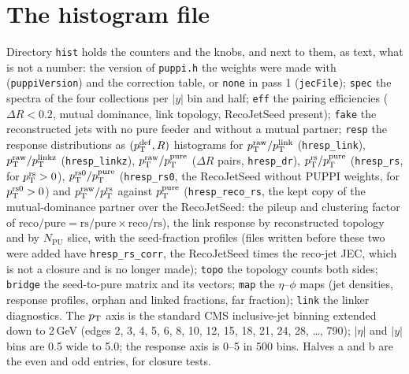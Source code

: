 \section{The histogram file}
\label{s:histos}
Directory \texttt{hist} holds the counters and the knobs, and next to them,
as text, what is not a number: the version of \texttt{puppi.h} the weights
were made with (\texttt{puppiVersion}) and the correction table, or
\texttt{none} in pass 1 (\texttt{jecFile}); \texttt{spec} the spectra
of the four collections per $|y|$ bin and half; \texttt{eff} the pairing
efficiencies ($\Delta R<0.2$, mutual dominance, link topology, RecoJetSeed
present); \texttt{fake} the reconstructed jets with no pure feeder and without
a mutual partner; \texttt{resp} the response distributions as
$(p_{\mathrm{T}}^{\mathrm{def}}, R)$ histograms for $p_{\mathrm{T}}^{\mathrm{raw}}/p_{\mathrm{T}}^{\mathrm{link}}$
(\texttt{hresp\_link}), $p_{\mathrm{T}}^{\mathrm{raw}}/p_{\mathrm{T}}^{\mathrm{linkz}}$ (\texttt{hresp\_linkz}),
$p_{\mathrm{T}}^{\mathrm{raw}}/p_{\mathrm{T}}^{\mathrm{pure}}$ ($\Delta R$ pairs, \texttt{hresp\_dr}), $p_{\mathrm{T}}^{\mathrm{rs}}/p_{\mathrm{T}}^{\mathrm{pure}}$
(\texttt{hresp\_rs}, for $p_{\mathrm{T}}^{\mathrm{rs}}>0$), $p_{\mathrm{T}}^{\mathrm{rs0}}/p_{\mathrm{T}}^{\mathrm{pure}}$
(\texttt{hresp\_rs0}, the RecoJetSeed without PUPPI weights, for
$p_{\mathrm{T}}^{\mathrm{rs0}}>0$) and $p_{\mathrm{T}}^{\mathrm{raw}}/p_{\mathrm{T}}^{\mathrm{rs}}$ against $p_{\mathrm{T}}^{\mathrm{pure}}$
(\texttt{hresp\_reco\_rs}, the kept copy of the mutual-dominance partner over
the RecoJetSeed: the pileup and clustering factor of
$\mathrm{reco}/\mathrm{pure} = \mathrm{rs}/\mathrm{pure}\times\mathrm{reco}/\mathrm{rs}$),
the link response by reconstructed topology and by $N_{\mathrm{PU}}$ slice,
with the seed-fraction profiles (files written before these two were added have
\texttt{hresp\_rs\_corr}, the RecoJetSeed times the reco-jet JEC, which is
not a closure and is no longer made); \texttt{topo} the topology counts both sides;
\texttt{bridge} the seed-to-pure matrix and its vectors; \texttt{map} the
$\eta$--$\phi$ maps (jet densities, response profiles, orphan and linked
fractions, far fraction); \texttt{link} the linker diagnostics. The
$p_{\mathrm{T}}$ axis is the standard CMS inclusive-jet binning extended down to 2\,GeV
(edges 2, 3, 4, 5, 6, 8, 10, 12, 15, 18, 21, 24, 28, \ldots, 790); $|\eta|$ and
$|y|$ bins are 0.5 wide to 5.0; the response axis is 0--5 in 500 bins.
Halves a and b are the even and odd entries, for closure tests.
